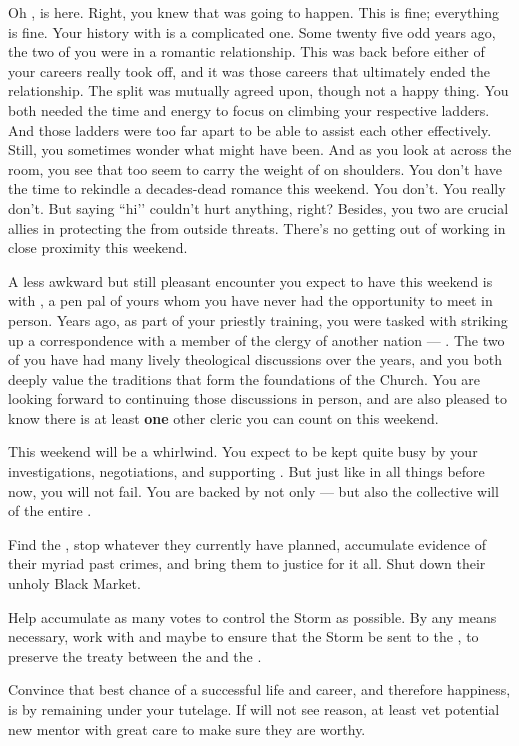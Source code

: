 \documentclass[char]{GL2020}
\begin{document}
Oh \cTechGod{}, \cDiplomat{} is here. Right, you knew that was going to happen. This is fine; everything is fine. Your history with \cDiplomat{} is a complicated one. Some twenty five odd years ago, the two of you were in a romantic relationship. This was back before either of your careers really took off, and it was those careers that ultimately ended the relationship. The split was mutually agreed upon, though not a happy thing. You both needed the time and energy to focus on climbing your respective ladders. And those ladders were too far apart to be able to assist each other effectively. Still, you sometimes wonder what might have been. And as you look at \cDiplomat{\them} across the room, you see that \cDiplomat{\they} too seem\cDiplomat{\verbs} to carry the weight of \pEarth{} on \cDiplomat{\their} shoulders. You don’t have the time to rekindle a decades-dead romance this weekend. You don’t. You really don’t. But saying ``hi’’ couldn’t hurt anything, right? Besides, you two are crucial allies in protecting the \pTech{} from outside threats. There’s no getting out of working in close proximity this weekend.

A less awkward but still pleasant encounter you expect to have this weekend is with \cHedonist{\intro}, a pen pal of yours whom you have never had the opportunity to meet in person. Years ago, as part of your priestly training, you were tasked with striking up a correspondence with a member of the clergy of another nation — \cHedonist{}. The two of you have had many lively theological discussions over the years, and you both deeply value the traditions that form the foundations of the Church. You are looking forward to continuing those discussions in person, and are also pleased to know there is at least \textbf{one} other cleric you can count on this weekend.

This weekend will be a whirlwind. You expect to be kept quite busy by your investigations, negotiations, and supporting \cScholarship{}. But just like in all things before now, you will not fail. You are backed by not only \cTechGod{} — but also the collective will of the entire \pTech{}.

\begin{itemz}
    \item Find the \pGoaties{}, stop whatever they currently have planned, accumulate evidence of their myriad past crimes, and bring them to justice for it all. Shut down their unholy Black Market.
    \item Help \cScholarship{} accumulate as many votes to control the Storm as possible. By any means necessary, work with \cDiplomat{} and maybe \cEvil{} to ensure that the Storm be sent to the \pShip{}, to preserve the treaty between the \pFarm{} and the \pTech{}.
    \item Convince \cScholarship{} that \cScholarship{\their} best chance of a successful life and career, and therefore happiness, is by remaining under your tutelage. If \cScholarship{\they} will not see reason, at least vet \cScholarship{\their} potential new mentor with great care to make sure they are worthy.
\end{itemz}
\end{document}

